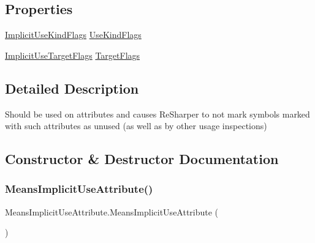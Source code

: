 \subsection*{Properties}
\begin{DoxyCompactItemize}
\item 
\mbox{\hyperlink{_annotations_8cs_acc26806cec0b003502b38c6c2ee67fd1}{Implicit\+Use\+Kind\+Flags}} \mbox{\hyperlink{class_means_implicit_use_attribute_af242c18a9e6e8db8d83c212231b1cd8c}{Use\+Kind\+Flags}}
\item 
\mbox{\hyperlink{_annotations_8cs_a59f21202ead30f3d1e2093e42214bf7c}{Implicit\+Use\+Target\+Flags}} \mbox{\hyperlink{class_means_implicit_use_attribute_abf0718c3b739197f26771fb693f280ac}{Target\+Flags}}
\end{DoxyCompactItemize}


\subsection{Detailed Description}
Should be used on attributes and causes Re\+Sharper to not mark symbols marked with such attributes as unused (as well as by other usage inspections) 



\subsection{Constructor \& Destructor Documentation}
\mbox{\label{class_means_implicit_use_attribute_ae37aa98103c42c47a777628dcbbc775b}} 
\subsubsection{\texorpdfstring{Means\+Implicit\+Use\+Attribute()}{MeansImplicitUseAttribute()}\hspace{0.1cm}{\footnotesize\ttfamily [1/4]}}
{\footnotesize\ttfamily Means\+Implicit\+Use\+Attribute.\+Means\+Implicit\+Use\+Attribute (\begin{DoxyParamCaption}{ }\end{DoxyParamCaption})}

